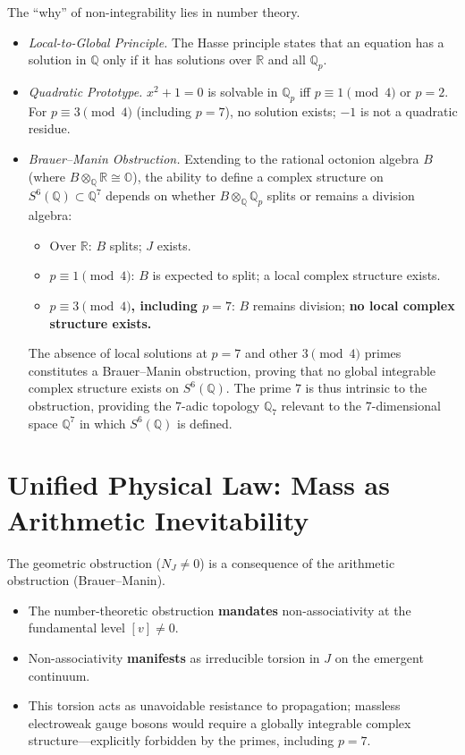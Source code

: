 \documentclass[12pt]{article}
\begin{document}
The “why” of non-integrability lies in number theory.

\begin{itemize}
    \item \emph{Local-to-Global Principle.} The Hasse principle states that an equation has a solution in \(\mathbb{Q}\) only if it has solutions over \(\mathbb{R}\) and all \(\mathbb{Q}_p\).
    \item \emph{Quadratic Prototype.} \(x^2 + 1 = 0\) is solvable in \(\mathbb{Q}_p\) iff \(p \equiv 1 \pmod{4}\) or \(p=2\). For \(p \equiv 3 \pmod{4}\) (including \(p=7\)), no solution exists; \(-1\) is not a quadratic residue.
    \item \emph{Brauer–Manin Obstruction.} Extending to the rational octonion algebra \(B\) (where \(B \otimes_{\mathbb{Q}} \mathbb{R} \cong \mathbb{O}\)), the ability to define a complex structure on \(S^6(\mathbb{Q}) \subset \mathbb{Q}^7\) depends on whether \(B \otimes_{\mathbb{Q}} \mathbb{Q}_p\) splits or remains a division algebra:
    \begin{itemize}
        \item Over \(\mathbb{R}\): \(B\) splits; \(J\) exists.
        \item \(p \equiv 1 \pmod{4}\): \(B\) is expected to split; a local complex structure exists.
        \item \textbf{\(p \equiv 3 \pmod{4}\), including \(p=7\)}: \(B\) remains division; \textbf{no local complex structure exists.}
    \end{itemize}
    The absence of local solutions at \(p=7\) and other \(3 \pmod{4}\) primes constitutes a Brauer–Manin obstruction, proving that no global integrable complex structure exists on \(S^6(\mathbb{Q})\). The prime \(7\) is thus intrinsic to the obstruction, providing the 7-adic topology \(\mathbb{Q}_7\) relevant to the 7-dimensional space \(\mathbb{Q}^7\) in which \(S^6(\mathbb{Q})\) is defined.
\end{itemize}

\section{Unified Physical Law: Mass as Arithmetic Inevitability}

The geometric obstruction (\(N_J \neq 0\)) is a consequence of the arithmetic obstruction (Brauer–Manin).

\begin{itemize}
    \item The number-theoretic obstruction \textbf{mandates} non-associativity at the fundamental level \([v] \neq 0\).
    \item Non-associativity \textbf{manifests} as irreducible torsion in \(J\) on the emergent continuum.
    \item This torsion acts as unavoidable resistance to propagation; massless electroweak gauge bosons would require a globally integrable complex structure—explicitly forbidden by the primes, including \(p=7\).
\end{itemize}
\end{document}
